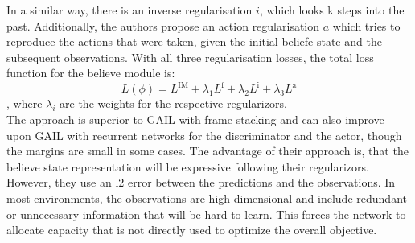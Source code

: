 In a similar way, there is an inverse regularisation $i$, which looks k steps into the past. Additionally, the authors propose an action regularisation $a$ which tries to reproduce the actions that were 
taken, given the initial beliefe state and the subsequent observations. With all three regularisation losses, the total loss function for the believe module is:
\begin{equation}
    L(\phi) = L^\text{IM} + \lambda_1 L^\text{f} + \lambda_2 L^\text{i} + \lambda_3 L^\text{a}
\end{equation}
, where $\lambda_i$ are the weights for the respective regularizors. \\
The approach is superior to GAIL with frame stacking and can also improve upon GAIL with recurrent networks for the discriminator and the actor, though the margins are small in some cases. The advantage 
of their approach is, that the believe state representation will be expressive following their regularizors. However, they use an l2 error between the predictions and the observations. In most environments, 
the observations are high dimensional and include redundant or unnecessary information that will be hard to learn. This forces the network to allocate capacity that is not directly used to 
optimize the overall objective. 

